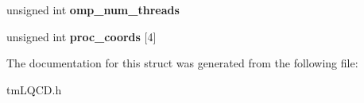 \begin{DoxyCompactItemize}
\item 
\hypertarget{structtmLQCD__mpi__params_adaa72943053f1407e160441c56c66548}{unsigned int {\bfseries omp\-\_\-num\-\_\-threads}}\label{structtmLQCD__mpi__params_adaa72943053f1407e160441c56c66548}

\item 
\hypertarget{structtmLQCD__mpi__params_a057f8e863cb78f939a72f862a7e690fc}{unsigned int {\bfseries proc\-\_\-coords} \mbox{[}4\mbox{]}}\label{structtmLQCD__mpi__params_a057f8e863cb78f939a72f862a7e690fc}

\end{DoxyCompactItemize}


The documentation for this struct was generated from the following file\-:\begin{DoxyCompactItemize}
\item 
tm\-L\-Q\-C\-D.\-h\end{DoxyCompactItemize}

